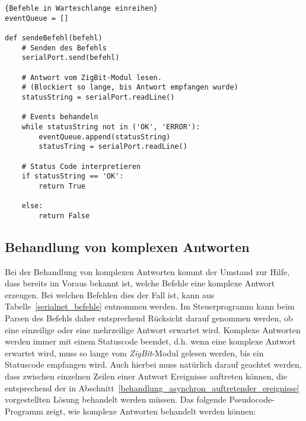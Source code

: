             \begin{lstlisting}{Befehle in Warteschlange einreihen}
eventQueue = []

def sendeBefehl(befehl)
    # Senden des Befehls
    serialPort.send(befehl)

    # Antwort vom ZigBit-Modul lesen.
    # (Blockiert so lange, bis Antwort empfangen wurde)
    statusString = serialPort.readLine()

    # Events behandeln 
    while statusString not in ('OK', 'ERROR'):
        eventQueue.append(statusString)
        statusTring = serialPort.readLine()

    # Status Code interpretieren
    if statusString == 'OK':
        return True
    
    else:
        return False
            \end{lstlisting}

        \subsection{Behandlung von komplexen Antworten}
            \label{behandlung_von_komplexen_antworten}
            Bei der Behandlung von komplexen Antworten kommt der Umstand zur Hilfe, dass bereits
            im Voraus bekannt ist, welche Befehle eine komplexe Antwort erzeugen. Bei welchen Befehlen dies
            der Fall ist, kann aus Tabelle~\ref{serialnet_befehle} entnommen werden. Im Steuerprogramm kann beim
            Parsen des Befehls daher entsprechend Rücksicht darauf genommen werden, ob eine einzeilige oder
            eine mehrzeilige Antwort erwartet wird. Komplexe Antworten werden immer mit einem Statuscode
            beendet, d.h. wenn eine komplexe Antwort erwartet wird, muss so lange vom \emph{ZigBit}-Modul
            gelesen werden, bis ein Statuscode empfangen wird. Auch hierbei muss natürlich darauf geachtet
            werden, dass zwischen einzelnen Zeilen einer Antwort Ereignisse auftreten können, die entsprechend
            der in Abschnitt~\ref{behandlung_asynchron_auftretender_ereignisse} vorgestellten Lösung behandelt 
            werden müssen. Das folgende Pseudocode-Programm zeigt, wie komplexe Antworten behandelt werden können:

